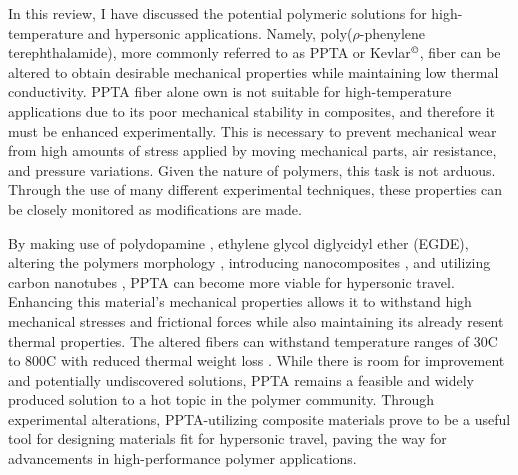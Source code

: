 \documentclass[12pt]{article}
\begin{document}
\begin{multicols}{2}
\indent In this review, I have discussed the potential polymeric solutions for high-temperature and hypersonic applications. Namely, poly($\rho$-phenylene terephthalamide), more commonly referred to as PPTA or Kevlar$^{\text{\textcopyright}}$, fiber can be altered to obtain desirable mechanical properties while maintaining low thermal conductivity. \citep{LiTong2022} PPTA fiber alone own is not suitable for high-temperature applications due to its poor mechanical stability in composites, and therefore it must be enhanced experimentally. This is necessary to prevent mechanical wear from high amounts of stress applied by moving mechanical parts, air resistance, and pressure variations. Given the nature of polymers, this task is not arduous. Through the use of many different experimental techniques, these properties can be closely monitored as modifications are made. 

\indent By making use of polydopamine \citep{Yuan2017}, ethylene glycol diglycidyl ether (EGDE)\citep{LeiWang2017}, altering the polymers morphology \citep{Kanbargi2017}, introducing nanocomposites \citep{BoZhang2021}, and utilizing carbon nanotubes \citep{Yang2019}, PPTA can become more viable for hypersonic travel. Enhancing this material's mechanical properties allows it to withstand high mechanical stresses and frictional forces while also maintaining its already resent thermal properties. The altered fibers can withstand temperature ranges of 30\degree C to 800\degree C with reduced thermal weight loss \citep{ShushengChen2014}. While there is room for improvement and potentially undiscovered solutions, PPTA remains a feasible and widely produced solution to a hot topic in the polymer community. Through experimental alterations, PPTA-utilizing composite materials prove to be a useful tool for designing materials fit for hypersonic travel, paving the way for advancements in high-performance polymer applications.

\end{multicols}

\newpage 


 
\end{document}
